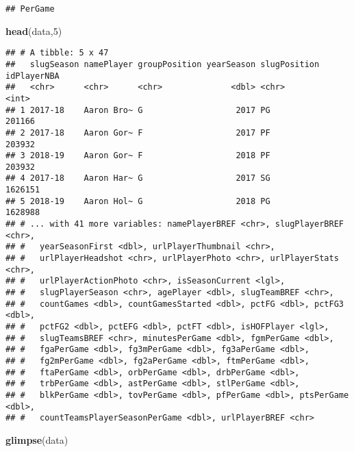 \documentclass[]{article}
\newenvironment{Shaded}{\begin{snugshade}}{\end{snugshade}}
\newcommand{\KeywordTok}[1]{\textcolor[rgb]{0.13,0.29,0.53}{\textbf{#1}}}
\newcommand{\DecValTok}[1]{\textcolor[rgb]{0.00,0.00,0.81}{#1}}
\newcommand{\NormalTok}[1]{#1}
\begin{document}
\begin{verbatim}
## PerGame
\end{verbatim}

\begin{Shaded}
\begin{Highlighting}[]
\KeywordTok{head}\NormalTok{(data,}\DecValTok{5}\NormalTok{)}
\end{Highlighting}
\end{Shaded}

\begin{verbatim}
## # A tibble: 5 x 47
##   slugSeason namePlayer groupPosition yearSeason slugPosition idPlayerNBA
##   <chr>      <chr>      <chr>              <dbl> <chr>              <int>
## 1 2017-18    Aaron Bro~ G                   2017 PG                201166
## 2 2017-18    Aaron Gor~ F                   2017 PF                203932
## 3 2018-19    Aaron Gor~ F                   2018 PF                203932
## 4 2017-18    Aaron Har~ G                   2017 SG               1626151
## 5 2018-19    Aaron Hol~ G                   2018 PG               1628988
## # ... with 41 more variables: namePlayerBREF <chr>, slugPlayerBREF <chr>,
## #   yearSeasonFirst <dbl>, urlPlayerThumbnail <chr>,
## #   urlPlayerHeadshot <chr>, urlPlayerPhoto <chr>, urlPlayerStats <chr>,
## #   urlPlayerActionPhoto <chr>, isSeasonCurrent <lgl>,
## #   slugPlayerSeason <chr>, agePlayer <dbl>, slugTeamBREF <chr>,
## #   countGames <dbl>, countGamesStarted <dbl>, pctFG <dbl>, pctFG3 <dbl>,
## #   pctFG2 <dbl>, pctEFG <dbl>, pctFT <dbl>, isHOFPlayer <lgl>,
## #   slugTeamsBREF <chr>, minutesPerGame <dbl>, fgmPerGame <dbl>,
## #   fgaPerGame <dbl>, fg3mPerGame <dbl>, fg3aPerGame <dbl>,
## #   fg2mPerGame <dbl>, fg2aPerGame <dbl>, ftmPerGame <dbl>,
## #   ftaPerGame <dbl>, orbPerGame <dbl>, drbPerGame <dbl>,
## #   trbPerGame <dbl>, astPerGame <dbl>, stlPerGame <dbl>,
## #   blkPerGame <dbl>, tovPerGame <dbl>, pfPerGame <dbl>, ptsPerGame <dbl>,
## #   countTeamsPlayerSeasonPerGame <dbl>, urlPlayerBREF <chr>
\end{verbatim}

\begin{Shaded}
\begin{Highlighting}[]
\KeywordTok{glimpse}\NormalTok{(data)}
\end{Highlighting}
\end{Shaded}
\end{document}
